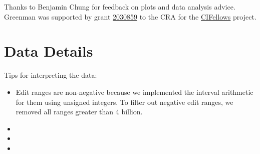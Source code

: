 \documentclass[english,submission,cleveref]{programming}
\begin{document}
\acks

Thanks to Benjamin Chung for feedback on plots and data analysis advice.
Greenman was supported by
grant \href{https://nsf.gov/awardsearch/showAward?AWD_ID=2030859&HistoricalAwards=false}{2030859}
to the CRA for the \href{https://cifellows2020.org}{CIFellows} project.

\newpage

\appendix

\section{Data Details}

Tips for interpreting the data:

\begin{itemize}
  \item
    Edit ranges are non-negative because we
    implemented the interval arithmetic for them using unsigned integers.
    To filter out negative edit ranges, we removed all ranges
    greater than 4 billion.

  \item
  \item
  \item
\end{itemize}

\newpage


\end{document}
